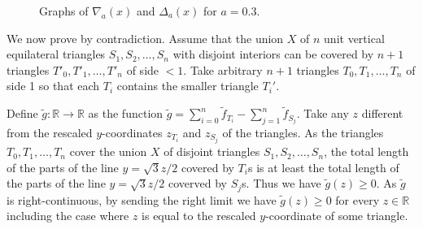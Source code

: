 \documentclass[a4paper]{amsart}
\theoremstyle{plain}
\theoremstyle{definition}
\begin{document}
\begin{figure}
  \centering
  \qquad
  \label{fig:graph1}
  \caption{Graphs of $\nabla_a(x)$ and $\Delta_a(x)$ for $a = 0.3$.}
\end{figure}





We now prove  by contradiction. Assume that the union \(X\) of \(n\) unit vertical equilateral triangles \(S_1, S_2, \dots, S_n\) with disjoint interiors can be covered by \(n+1\) triangles \(T'_0, T'_1, \dots, T'_n\) of side \(< 1\). Take arbitrary \(n + 1\) triangles \(T_0, T_1, \dots, T_n\) of side 1 so that each \(T_i\) contains the smaller triangle \(T_i'\).

Define \(\tilde{g} : \mathbb{R} \to \mathbb{R}\) as the function \(\tilde{g} = \sum_{i=0}^n \tilde{f}_{T_i} - \sum_{j=1}^n \tilde{f}_{S_j}\). Take any \(z\) different from the rescaled \(y\)-coordinates \(z_{T_i}\) and \(z_{S_j}\) of the triangles. As the triangles \(T_0, T_1, \dots, T_n\) cover the union \(X\) of disjoint triangles \(S_1, S_2, \dots, S_n\), the total length of the parts of the line \(y = \sqrt{3}z/2\) covered by \(T_i\)\textquotesingle s is at least the total length of the parts of the line \(y = \sqrt{3}z/2\) coverved by \(S_j\)\textquotesingle s. Thus we have \(\tilde{g}(z) \geq 0\). As \(\tilde{g}\) is right-continuous, by sending the right limit we have \(\tilde{g}(z) \geq 0\) for every \(z \in \mathbb{R}\) including the case where \(z\) is equal to the rescaled \(y\)-coordinate of some triangle.
\end{document}
